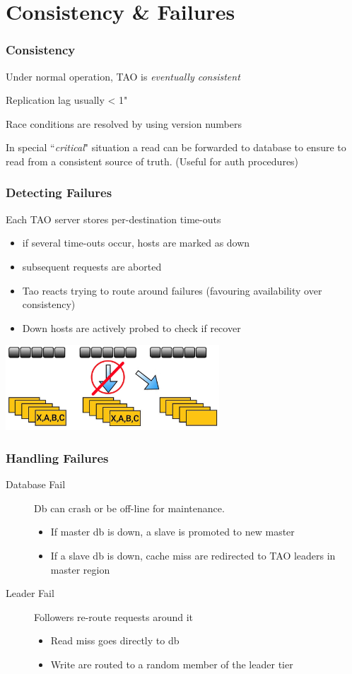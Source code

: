 \section{Consistency \& Failures}
\begin{frame}[t]\frametitle{Consistency}
	Under normal operation, TAO is \emph{eventually consistent}

	Replication lag usually < 1"

	Race conditions are resolved by using version numbers

	In special ``\emph{critical}" situation a read can be forwarded to database to ensure to read from a consistent source of truth. (Useful for auth procedures)

\end{frame}

\begin{frame}[t]\frametitle{Detecting Failures}
    Each TAO server stores per-destination time-outs
    \begin{itemize}
    	\item if several time-outs occur, hosts are marked as down
    	\item subsequent requests are aborted
    	\item Tao reacts trying to route around failures (favouring availability over consistency)
    	\item Down hosts are actively probed to check if recover
    \end{itemize}
    \centering
    \includegraphics[width=0.6\textwidth]{figs/fail.jpg}

\end{frame}

\begin{frame}[c]\frametitle{Handling Failures}
    \begin{description}
    	\item[Database Fail] Db can crash or be off-line for maintenance. 
    	\begin{itemize}
    		\item If master db is down, a slave is promoted to new master
    		\item If a slave db is down, cache miss are redirected to TAO leaders in master region
    	\end{itemize}
    	\item[Leader Fail] Followers re-route requests around it
    	\begin{itemize}
    		\item Read miss goes directly to db
    		\item Write are routed to a random member of the leader tier
    	\end{itemize}
    \end{description}
\end{frame}

